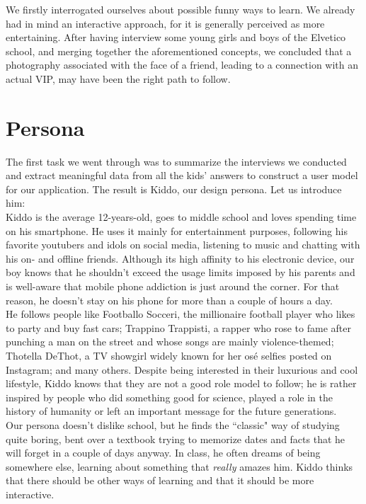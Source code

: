 \documentclass[12pt]{scrartcl}
\begin{document}
	We firstly interrogated ourselves about possible funny ways to learn.  We already had in mind an interactive approach, for it is generally perceived as more entertaining. After having interview some young girls and boys of the Elvetico school, and merging together the aforementioned concepts, we concluded that a photography associated with the face of a friend, leading to a connection with an actual VIP, may have been the right path to follow. 


\section{Persona}

	
	The first task we went through was to summarize the interviews we conducted and extract meaningful data from all the kids' 
	answers to construct a user model for our application. The result is Kiddo, our design persona. Let us introduce him:\\
	
	Kiddo is the average 12-years-old, goes to middle school and loves spending time on his smartphone. He uses it mainly for 
	entertainment purposes, following his favorite youtubers and idols on social media, listening to music and chatting with his on- 
	and offline friends. Although its high affinity to his electronic device, our boy knows that he shouldn't exceed the usage limits 
	imposed by his parents and is well-aware that mobile phone addiction is just around the corner. For that reason, he doesn't
	stay on his phone for more than a couple of hours a day.\\
	
	He follows people like Footballo Socceri, the millionaire football player who likes to party and buy fast cars; 
	Trappino Trappisti, a rapper who rose to fame after punching a man on the street and whose songs are mainly violence-themed;
	Thotella DeThot, a TV showgirl widely known for her osé selfies posted on Instagram; and many others. Despite being interested 
	in their luxurious and cool lifestyle, Kiddo knows that they are not a good role model to follow; he is rather inspired by people
	who did something good for science, played a role in the history of humanity or left an important message for the future
	generations.\\
	
	Our persona doesn't dislike school, but he finds the ``classic" way of studying quite boring, bent over a textbook trying to memorize 
	dates and facts that he will forget in a couple of days anyway. In class, he often dreams of being somewhere else, learning 
	about something that \textit{really} amazes him. Kiddo thinks that there should be other ways of learning and that it should be
	more interactive.\\	
	
\end{document}
